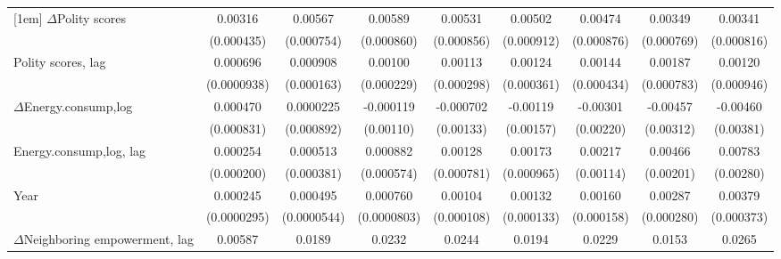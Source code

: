 \begin{table}[htbp]
\begin{tabular}{l*{8}{c}}
[1em]
$\Delta$Polity scores            &     0.00316\sym{***}&     0.00567\sym{***}&     0.00589\sym{***}&     0.00531\sym{***}&     0.00502\sym{***}&     0.00474\sym{***}&     0.00349\sym{***}&     0.00341\sym{***}\\
                    &  (0.000435)         &  (0.000754)         &  (0.000860)         &  (0.000856)         &  (0.000912)         &  (0.000876)         &  (0.000769)         &  (0.000816)         \\
[1em]
Polity scores, lag           &    0.000696\sym{***}&    0.000908\sym{***}&     0.00100\sym{***}&     0.00113\sym{***}&     0.00124\sym{***}&     0.00144\sym{***}&     0.00187\sym{**} &     0.00120         \\
                    & (0.0000938)         &  (0.000163)         &  (0.000229)         &  (0.000298)         &  (0.000361)         &  (0.000434)         &  (0.000783)         &  (0.000946)         \\
[1em]
$\Delta$Energy.consump,log             &    0.000470         &   0.0000225         &   -0.000119         &   -0.000702         &    -0.00119         &    -0.00301         &    -0.00457         &    -0.00460         \\
                    &  (0.000831)         &  (0.000892)         &   (0.00110)         &   (0.00133)         &   (0.00157)         &   (0.00220)         &   (0.00312)         &   (0.00381)         \\
[1em]
Energy.consump,log, lag             &    0.000254         &    0.000513         &    0.000882         &     0.00128         &     0.00173\sym{*}  &     0.00217\sym{*}  &     0.00466\sym{**} &     0.00783\sym{***}\\
                    &  (0.000200)         &  (0.000381)         &  (0.000574)         &  (0.000781)         &  (0.000965)         &   (0.00114)         &   (0.00201)         &   (0.00280)         \\
[1em]
Year                &    0.000245\sym{***}&    0.000495\sym{***}&    0.000760\sym{***}&     0.00104\sym{***}&     0.00132\sym{***}&     0.00160\sym{***}&     0.00287\sym{***}&     0.00379\sym{***}\\
                    & (0.0000295)         & (0.0000544)         & (0.0000803)         &  (0.000108)         &  (0.000133)         &  (0.000158)         &  (0.000280)         &  (0.000373)         \\
[1em]
$\Delta$Neighboring empowerment, lag&     0.00587         &      0.0189\sym{***}&      0.0232\sym{***}&      0.0244\sym{***}&      0.0194\sym{**} &      0.0229\sym{***}&      0.0153         &      0.0265\sym{**} \\

\end{tabular}
\end{table}
